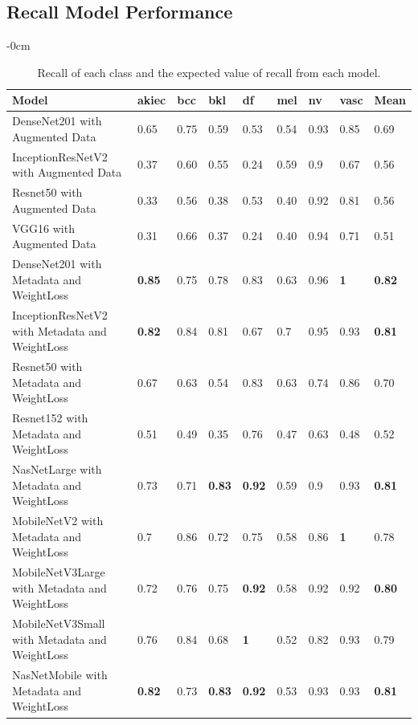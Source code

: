 \documentclass[sensors,article,accept,pdftex,moreauthors]{Definitions/mdpi}
\begin{document}
		
		\subsection[\appendixname~\thesection]{Recall Model Performance}
		\begin{table}[H]
\caption{{Recall%
} of each class and the expected value of recall from each model.}
\label{appendix-table:recall-score-summary}

\begin{adjustwidth}{-\extralength}{0cm}
\centering
\begin{tabular}{p{9cm}  p{0.8cm}  p{0.8cm}  p{0.6cm}  p{0.6cm}  p{0.6cm}  p{0.6cm}  p{0.8cm}  p{0.9cm}} 
	\toprule
	\textbf{Model} & \textbf{akiec} & \textbf{bcc} & \textbf{bkl} & \textbf{df} & \textbf{mel} & \textbf{nv} & \textbf{vasc} & \textbf{Mean} \\
	\midrule
	DenseNet201 with Augmented Data & 0.65 & 0.75 & 0.59 & 0.53 & 0.54 & 0.93 & 0.85 & 0.69\\ 
	\midrule
	InceptionResNetV2 with Augmented Data & 0.37 & 0.60 & 0.55 & 0.24 & 0.59 & 0.9 & 0.67 & 0.56\\
	\midrule
	Resnet50 with Augmented Data & 0.33 & 0.56 & 0.38 & 0.53 & 0.40 & 0.92 & 0.81 & 0.56\\
	\midrule 	
	VGG16 with Augmented Data & 0.31 & 0.66 & 0.37 & 0.24 & 0.40 & 0.94 & 0.71 & 0.51\\ 
	\midrule		
	DenseNet201 with Metadata and WeightLoss & \textbf{{0.85}} & 0.75 & 0.78 & 0.83 & 0.63 & 0.96 & \textbf{1} & \textbf{0.82}\\
	\midrule
	InceptionResNetV2 with Metadata and WeightLoss & \textbf{0.82} & 0.84 & 0.81 & 0.67 & 0.7 & 0.95 & 0.93 & \textbf{0.81}\\
	\midrule
	Resnet50 with Metadata and WeightLoss & 0.67 & 0.63 & 0.54 & 0.83 & 0.63 & 0.74 & 0.86 & 0.70\\
	\midrule
	Resnet152 with Metadata and WeightLoss & 0.51 & 0.49 & 0.35 & 0.76 & 0.47 & 0.63 & 0.48 & 0.52\\
	\midrule
	NasNetLarge with Metadata and WeightLoss & 0.73 & 0.71 & \textbf{0.83} & \textbf{0.92} & 0.59 & 0.9 & 0.93 & \textbf{0.81}\\
	\midrule
	MobileNetV2 with Metadata and WeightLoss & 0.7 & 0.86 & 0.72 & 0.75 & 0.58 & 0.86 & \textbf{1} & 0.78\\
	\midrule
	MobileNetV3Large with Metadata and WeightLoss & 0.72 & 0.76 & 0.75 & \textbf{0.92} & 0.58 & 0.92 & 0.92 & \textbf{0.80}\\
	\midrule
	MobileNetV3Small with Metadata and WeightLoss & 0.76 & 0.84 & 0.68 & \textbf{1} & 0.52 & 0.82 & 0.93 & 0.79\\
	\midrule
	NasNetMobile with Metadata and WeightLoss & \textbf{0.82} & 0.73 & \textbf{0.83} & \textbf{0.92} & 0.53 & 0.93 & 0.93 & \textbf{0.81}\\
	\bottomrule
\end{tabular}
\end{adjustwidth}
		\end{table}
		
\end{document}
